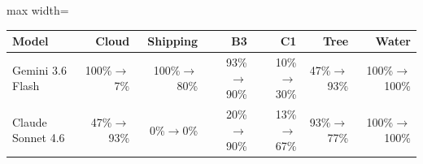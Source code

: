 \begin{adjustbox}{max width=\linewidth}
\begin{tabular}{@{}lrrrrrr@{}}
\toprule
Model & Cloud & Shipping & B3 & C1 & Tree & Water \\
\midrule
Gemini 3.6 Flash & 100\%$\to$7\% & 100\%$\to$80\% & 93\%$\to$90\% & 10\%$\to$30\% & 47\%$\to$93\% & 100\%$\to$100\% \\
Claude Sonnet 4.6 & 47\%$\to$93\% & 0\%$\to$0\% & 20\%$\to$90\% & 13\%$\to$67\% & 93\%$\to$77\% & 100\%$\to$100\% \\
\bottomrule
\end{tabular}
\end{adjustbox}

\par{}
